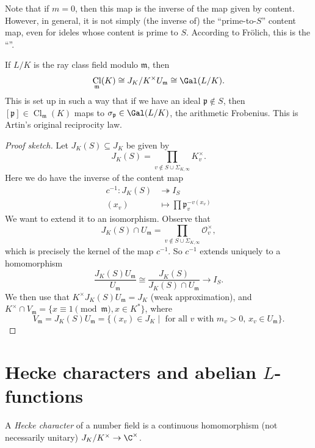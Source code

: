 \documentclass[a4paper]{article}
\DeclareMathOperator\Cl{\mathrm{Cl}}
\begin{document}
Note that if $m = 0$, then this map is the inverse of the map given by content. However, in general, it is not simply (the inverse of) the ``prime-to-$S$'' content map, even for ideles whose content is prime to $S$. According to Fr\"olich, this is the ``''.

If $L/K$ is the ray class field modulo $\mathfrak{m}$, then
\[
  \Cl_\mathfrak{m}(K) \cong J_K/K^\times U_\mathfrak{m} \cong \Gal(L/K).
\]
This is set up in such a way that if we have an ideal $\mathfrak{p} \not \in S$, then $[\mathfrak{p}] \in \Cl_\mathfrak{m}(K)$ maps to $\sigma_\mathfrak{p} \in \Gal(L/K)$, the arithmetic Frobenius. This is Artin's original reciprocity law.

\begin{proof}[Proof sketch]
  Let $J_K(S) \subseteq J_K$ be given by
  \[
    J_K(S) = \prod_{v \not\in S \cup \Sigma_{K, \infty}} K_v^\times.
  \]
  Here we do have the inverse of the content map
  \begin{align*}
    c^{-1}: J_K(S) &\twoheadrightarrow I_S\\
    (x_v) &\mapsto \prod \mathfrak{p}_v^{-v(x_v)}
  \end{align*}
  We want to extend it to an isomorphism. Observe that
  \[
    J_K(S) \cap U_\mathfrak{m} = \prod_{v \not \in S \cup \Sigma_{K, \infty}} \mathcal{O}_v^\times,
  \]
  which is precisely the kernel of the map $c^{-1}$. So $c^{-1}$ extends uniquely to a homomorphism
  \[
    \frac{J_K(S) U_\mathfrak{m}}{U_\mathfrak{m}} \cong \frac{J_K(S)}{J_K(S) \cap U_\mathfrak{m}} \to I_S.
  \]
  We then use that $K^\times J_K(S) U_\mathfrak{m} = J_K$ (weak approximation), and $K^\times \cap V_\mathfrak{m} = \{x \equiv 1 \pmod \mathfrak{m}, x \in K^*\}$, where
  \[
    V_\mathfrak{m} = J_K(S) U_\mathfrak{m} = \{(x_v)\in J_K \mid \text{ for all $v$ with $m_v > 0$, }x_v \in U_\mathfrak{m}\}.
  \]
\end{proof}

\section{Hecke characters and abelian \texorpdfstring{$L$}{L}-functions}

\begin{defi}
  A \emph{Hecke character} of a number field is a continuous homomorphism (not necessarily unitary) $J_K/K^\times \to \C^\times$.
\end{defi}
\end{document}
